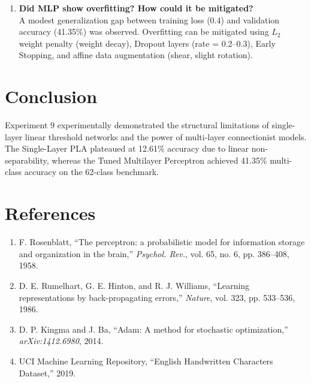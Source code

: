 \documentclass[12pt,a4paper]{article}
\begin{document}
\begin{enumerate}
    \item \textbf{Did MLP show overfitting? How could it be mitigated?} \\
    A modest generalization gap between training loss (0.4) and validation accuracy (41.35\%) was observed. Overfitting can be mitigated using $L_2$ weight penalty (weight decay), Dropout layers (rate = 0.2--0.3), Early Stopping, and affine data augmentation (shear, slight rotation).
\end{enumerate}

\section{Conclusion}
Experiment 9 experimentally demonstrated the structural limitations of single-layer linear threshold networks and the power of multi-layer connectionist models. The Single-Layer PLA plateaued at 12.61\% accuracy due to linear non-separability, whereas the Tuned Multilayer Perceptron achieved 41.35\% multi-class accuracy on the 62-class benchmark.

\section*{References}
\begin{enumerate}[noitemsep]
    \item F. Rosenblatt, ``The perceptron: a probabilistic model for information storage and organization in the brain,'' \textit{Psychol. Rev.}, vol. 65, no. 6, pp. 386--408, 1958.
    \item D. E. Rumelhart, G. E. Hinton, and R. J. Williams, ``Learning representations by back-propagating errors,'' \textit{Nature}, vol. 323, pp. 533--536, 1986.
    \item D. P. Kingma and J. Ba, ``Adam: A method for stochastic optimization,'' \textit{arXiv:1412.6980}, 2014.
    \item UCI Machine Learning Repository, ``English Handwritten Characters Dataset,'' 2019.
\end{enumerate}
\end{document}

